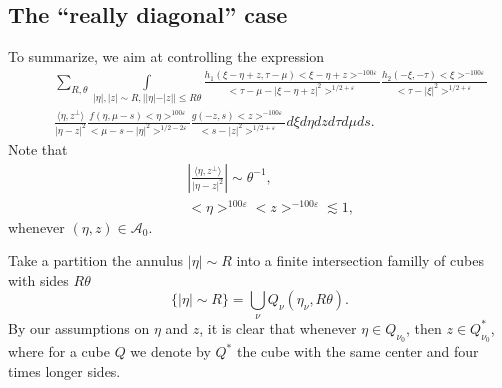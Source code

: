 \documentclass[draft,11pt,leqno]{amsart}
\newcommand{\ve}{\varepsilon}
\newcommand{\ca}{\mathcal A}
\newcommand{\intl}{\int\limits}
\newcommand{\suml}{\sum\limits}
\newcommand{\f}{\displaystyle\frac}
\newcommand{\dpr}[2]{\langle #1, #2\rangle}
\begin{document}
\subsection{The ``really diagonal'' case}
To summarize, we aim at controlling the expression
\begin{eqnarray}
\label{eq:200}
& &\suml_{R,\theta}\intl_{|\eta|,|z| \sim R, ||\eta|-|z||\leq R\theta}
\f{h_1(\xi-\eta+z,\tau-\mu)<\xi-\eta+z>^{-100\ve}}{<\tau-\mu-|\xi-\eta+z|^2>^
{1/2+\ve}} \f{h_2(-\xi,-\tau)<\xi>^{-100\ve}}{<\tau-|\xi|^2>^{1/2+\ve}} \\
& &
 \f{\dpr{\eta}{z^{\bot}}}{|\eta-z|^2}
\f{f(\eta,\mu-s)<\eta>^{100\ve}}{<\mu-s-|\eta|^2>^{1/2-2\ve}}
\f{g(-z,s)<z>^{-100\ve}}{<s-|z|^2>^{1/2+\ve}}
d\xi d\eta dz d\tau d\mu ds.
\nonumber
\end{eqnarray}
Note that
\begin{eqnarray*}
& &\left|\f{\dpr{\eta}{z^{\bot}}}{|\eta-z|^2}\right|\sim \theta^{-1},\\
& &<\eta>^{100\ve}<z>^{-100\ve}\lesssim 1,
\end{eqnarray*}
whenever $(\eta,z)\in \ca_0$.

Take a  partition the annulus $|\eta|\sim R$ into a finite intersection
familly of cubes  with sides $R\theta$
$$
\{|\eta|\sim R\}=\bigcup\limits_\nu Q_\nu(\eta_\nu, R\theta).
$$
By our assumptions on $\eta$ and $z$, it is clear that
whenever $\eta\in Q_{\nu_0}$, then $z \in Q_{\nu_0}^*$, where for a cube
$Q$ we denote by $Q^*$ the cube with the same center and four times longer
sides.
\end{document}
